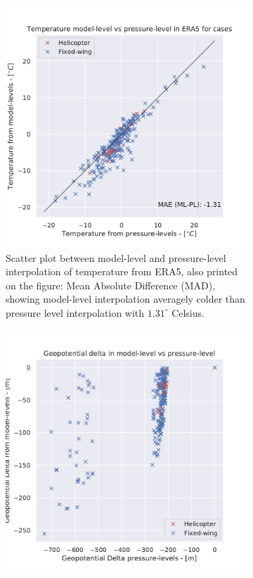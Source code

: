\begin{figure}
    \centering
    \begin{subfigure}[h]{0.45\textwidth}
    \includegraphics[width=\textwidth]{Figures/mlvspl.pdf}
    \caption{Scatter plot between model-level and pressure-level interpolation of temperature from ERA5, also printed on the figure: Mean Absolute Difference (MAD), showing model-level interpolation averagely colder than pressure level interpolation with $1.31^{\circ}$ Celsius.}
    \label{fig:mlvspltemp}
    \end{subfigure}
    \hfill
    \begin{subfigure}[h]{0.45\textwidth}
    \includegraphics[width=\textwidth]{Figures/geopot.pdf}

\end{subfigure}
\end{figure}
